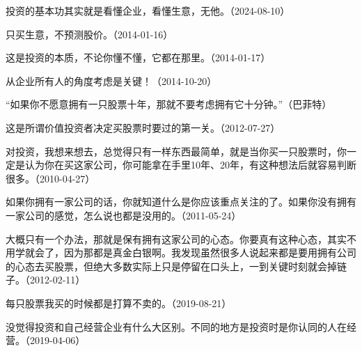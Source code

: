 投资的基本功其实就是看懂企业，看懂生意，无他。（2024-08-10）

只买生意，不预测股价。（2014-01-16）

这是投资的本质，不论你懂不懂，它都在那里。（2014-01-17）

从企业所有人的角度考虑是关键！（2014-10-20）

“如果你不愿意拥有一只股票十年，那就不要考虑拥有它十分钟。”（巴菲特）

这是所谓价值投资者决定买股票时要过的第一关。（2012-07-27）


对投资，我想来想去，总觉得只有一样东西最简单，就是当你买一只股票时，你一定是认为你在买这家公司，你可能拿在手里10年、20年，有这种想法后就容易判断很多。（2010-04-27）


如果你拥有一家公司的话，你就知道什么是你应该重点关注的了。如果你没有拥有一家公司的感觉，怎么说也都是没用的。（2011-05-24）


大概只有一个办法，那就是保有拥有这家公司的心态。你要真有这种心态，其实不用学就会了，因为那都是真金白银啊。我发现虽然很多人说起来都是要用拥有公司的心态去买股票，但绝大多数实际上只是停留在口头上，一到关键时刻就会掉链子。（2012-02-11）


每只股票我买的时候都是打算不卖的。（2019-08-21）


没觉得投资和自己经营企业有什么大区别。不同的地方是投资时是你认同的人在经营。（2019-04-06）
